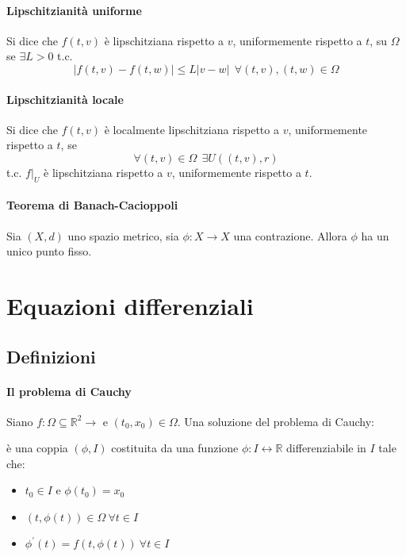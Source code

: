 \documentclass[a4paper,12pt]{article}
\begin{document}
\paragraph{Lipschitzianità uniforme}
Si dice che $f(t, v)$ è lipschitziana rispetto a $v$, uniformemente rispetto a $t$, su $\Omega$ se $\exists L>0$ t.c.
$$|f(t, v) - f(t, w)| \leq L|v-w|\ \ \forall (t,v), (t, w) \in \Omega$$

\paragraph{Lipschitzianità locale}
Si dice che $f(t, v)$ è localmente lipschitziana rispetto a $v$, uniformemente rispetto a $t$, se
$$\forall(t, v)\in \Omega\ \ \exists U((t, v), r)$$
t.c. $f|_U$ è lipschitziana rispetto a $v$, uniformemente rispetto a $t$.



\paragraph{Teorema di Banach-Cacioppoli}
Sia $(X, d)$ uno spazio metrico, sia $\phi : X\rightarrow X$ una contrazione.
Allora $\phi$ ha un unico punto fisso.

\section{Equazioni differenziali}

\subsection{Definizioni}
\paragraph{Il problema di Cauchy}
Siano $f:\Omega \subseteq \mathbb{R}^2 \longrightarrow $ e $ \left(t_0,x_0\right) \in \Omega.$ Una soluzione del problema di Cauchy:

è una coppia $\left( \phi , I \right)$ costituita da una funzione $\phi: I \longleftrightarrow \mathbb{R}$ differenziabile in $I$ tale che:
\begin{itemize}
\item $t_0 \in I$ e $ \phi\left(t_0\right)=x_0$
\item $ \left(t,\phi\left(t\right)\right) \in \Omega \ \forall t \in I$
\item $ \phi^{'}\left(t \right) = f\left(t,\phi\left(t\right)\right)\ \forall t \in I$
\end{itemize}
\end{document}
